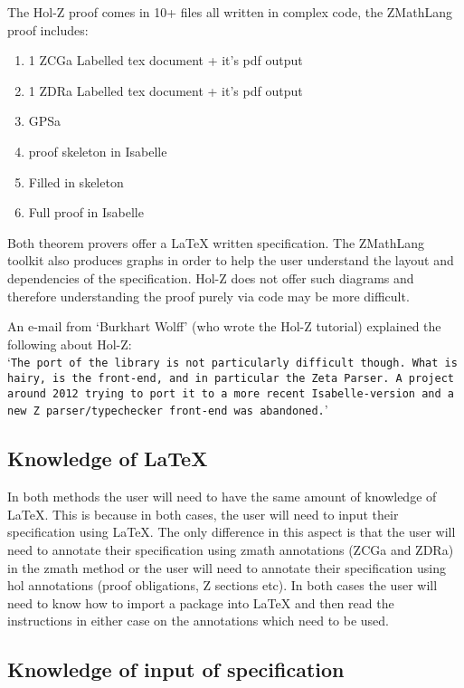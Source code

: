 The Hol-Z proof comes in 10+ files all written in complex code, the ZMathLang proof
includes:
\begin{enumerate}
    \item 1 ZCGa Labelled tex document + it's pdf output
    \item 1 ZDRa Labelled tex document + it's pdf output
    \item GPSa
    \item proof skeleton in Isabelle
    \item Filled in skeleton
    \item Full proof in Isabelle
\end{enumerate}

Both theorem provers offer a \LaTeX{} written specification.
The ZMathLang toolkit also produces graphs in order to help the user understand
the layout and dependencies of the specification. Hol-Z does not offer such diagrams and
therefore understanding the proof purely via code may be more difficult.

An e-mail from `Burkhart Wolff' (who wrote the Hol-Z tutorial) explained the following
about Hol-Z:
\\
`\texttt{The port of the library is not particularly difficult though.
What is hairy, is the front-end, and in particular the Zeta Parser.
A project around 2012 trying to port it to a more recent Isabelle-version
and a \\ new Z parser/typechecker front-end was abandoned.}'

\subsection{Knowledge of \LaTeX}

In both methods the user will need to have the same amount of knowledge of
\LaTeX{}. This is because in both cases, the user will need to input their
specification using \LaTeX{}. The only difference in this aspect is that the
user will need to annotate their specification using \gls{zmath} annotations
(ZCGa and ZDRa) in the \gls{zmath} method or the user will need to annotate
their specification using \gls{hol} annotations (proof obligations, Z sections
etc). In both cases the user will need to know how to import a package into
\LaTeX{} and then read the instructions in either case on the annotations which
need to be used.

\subsection{Knowledge of input of specification}
\label{knowledgeofinputforbb}

